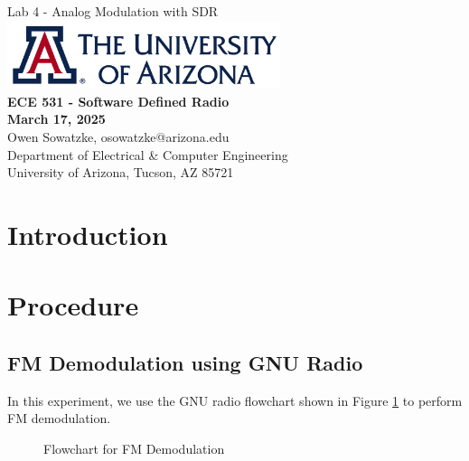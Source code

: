 \documentclass{article}
\begin{document}
\begin{titlepage}
	\centering
	{\huge Lab 4 - Analog Modulation with SDR}\\[0.25 in]
	\includegraphics[width=0.6\textwidth]{ua_logo.png}\\[0.25 in]
	{\large \textbf{ECE 531 - Software Defined Radio\\[0.25 in]
	March 17, 2025\\[0.25 in]}}
	{\large Owen Sowatzke, osowatzke@arizona.edu\\[0.05 in]
	Department of Electrical \& Computer Engineering\\[0.05 in]
	University of Arizona, Tucson, AZ 85721\\[0.5 in]}
	\hypersetup{linkcolor=navy-blue}
	\noindent\hrulefill
	\tableofcontents
	\noindent\hrulefill
\end{titlepage}


\section{Introduction}

\section{Procedure}

\subsection{FM Demodulation using GNU Radio}
\label{section::fm_demod_gnu_radio}

In this experiment, we use the GNU radio flowchart shown in Figure \ref{fig::fm_radio_flowchart} to perform FM demodulation.

\begin{figure}[H]
	\centerline{}
	\caption{Flowchart for FM Demodulation}
	\label{fig::fm_radio_flowchart}
\end{figure}
\end{document}
